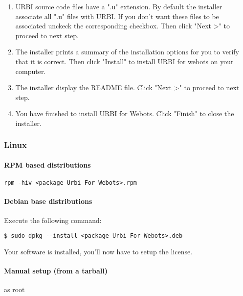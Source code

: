 \begin{enumerate}
\item URBI source code files have a ".u" extension. By default the
  installer associate all ".u" files with URBI. If you don't want
  these files to be associated unckeck the corresponding
  checkbox. Then click "Next >{}" to proceed to next step.

\item The installer prints a summary of the installation options for
  you to verify that it is correct. Then click "Install" to install
  URBI for webots on your computer.

\item The installer display the README file. Click "Next >{}" to
  proceed to next step.

\item You have finished to install URBI for Webots. Click "Finish" to
  close the installer.
\end{enumerate}

\subsubsection{Linux}
\label{webots.setup.linux}%

\paragraph{RPM based distributions}
\label{webots.setup.linux.rpm}%

\begin{lstlisting}[firstnumber=1,]
rpm -hiv <package Urbi For Webots>.rpm
\end{lstlisting}

\paragraph{Debian base distributions}
\label{webots.setup.linux.deb}%

Execute the following command:


\begin{lstlisting}[firstnumber=1,]
$ sudo dpkg --install <package Urbi For Webots>.deb
\end{lstlisting}

Your software is installed, you'll now have to setup the license.


\paragraph{Manual setup (from a tarball)}
\label{webots.setup.linux.tarball}%
     as root

